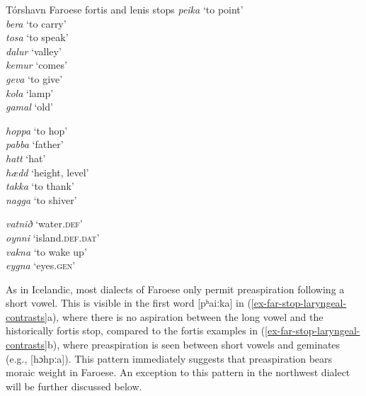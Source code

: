 \documentclass[output=paper,colorlinks,citecolor=brown]{langscibook}
\begin{document}
\ea Tórshavn Faroese fortis and lenis stops \citep{arnason2011}%
\label{ex-far-stop-laryngeal-contrasts}
\ea	 
\ea \textit{peika}	\tab\relax [pʰaiːka]	\tab `to point'\\	
	 \textit{bera}  \tab\relax [peːɹa]	    \tab `to carry'\\
\ex \textit{tosa}  \tab\relax [tʰoːsa]	    \tab `to speak'\\
	 \textit{dalur}	\tab\relax [tɛaːlʊɹ]	\tab `valley'\\
	 \ex \textit{kemur}	\tab\relax [tʃʰeːmʊɹ]   \tab `comes'\\		
	 \textit{geva} 	\tab\relax [tʃeːva] 	\tab `to give'\\
	 \ex \textit{kola} 	\tab\relax [kʰoːla] 	\tab `lamp'\\		
	 \textit{gamal}	\tab\relax [kɛaːmal]	\tab `old'\\
     \z
	
\ex	 
\ea \textit{hoppa} \tab\relax [hɔhpːa]  \tab `to hop'\\ 
	 \textit{pabba} \tab\relax [pʰapːa]  \tab `father'\\
	 \ex \textit{hatt}  \tab\relax [hahtː]   \tab `hat'\\ 
	 \textit{hædd}  \tab\relax [hatː]    \tab `height, level'\\
	 \ex \textit{takka} \tab\relax [tʰahkːa] \tab `to thank'\\ 
	 \textit{nagga} \tab\relax [nakːa]   \tab `to shiver'\\
     \z
	
\ex	
\ea \textit{vatnið} \tab\relax [vahtnɪ] \tab `water.\textsc{def}'\\ 
	 \textit{oynni}  \tab\relax [ɔitnɪ]  \tab `island.\textsc{def.dat}'\\
	 \ex \textit{vakna}  \tab\relax [vahkna] \tab `to wake up'\\ 
	 \textit{eygna}  \tab\relax [ɛkna]   \tab `eyes.\textsc{gen}'\\
     \z
	\z
\z

As in Icelandic, most dialects of Faroese only permit preaspiration following a short vowel.
This is visible in the first word [pʰaiːka] in (\ref{ex-far-stop-laryngeal-contrasts}a), where there is no aspiration between the long vowel and the historically fortis stop, compared to the fortis examples in (\ref{ex-far-stop-laryngeal-contrasts}b), where preaspiration is seen between short vowels and geminates (e.g., [hɔhpːa]). This pattern immediately suggests that preaspiration bears moraic weight in Faroese. An exception to this pattern in the northwest dialect will be further discussed below.
\end{document}
